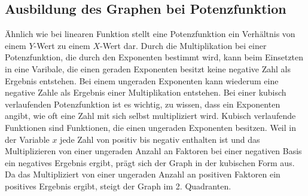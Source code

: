\subsection{Ausbildung des Graphen bei Potenzfunktion}\label{sec:Potenzfunktionen/Ausbildung des Graphen bei Potenzfunktionen}
Ähnlich wie bei linearen Funktion stellt eine Potenzfunktion ein Verhältnis von einem $Y$-Wert zu einem $X$-Wert dar. Durch die Multiplikation bei einer Potenzfunktion, die durch den Exponenten bestimmt wird, kann beim Einsetzten in eine Varibale, die einen geraden Exponenten besitzt keine negative Zahl als Ergebnis entstehen. Bei einem ungeraden Exponenten kann wiederum eine negative Zahle als Ergebnis einer Multiplikation entstehen. Bei einer kubisch verlaufenden Potenzfunktion ist es wichtig, zu wissen, dass ein Exponenten angibt, wie oft eine Zahl mit sich selbst multipliziert wird. Kubisch verlaufende Funktionen sind Funktionen, die einen ungeraden Exponenten besitzen. Weil in der Variable $x$ jede Zahl von positiv bis negativ enthalten ist und das Multiplizieren von einer ungeraden Anzahl an Faktoren bei einer negativen Basis ein negatives Ergebnis ergibt, prägt sich der Graph in der kubischen Form aus. Da das Multipliziert von einer ungeraden Anzahl an positiven Faktoren ein positives Ergebnis ergibt, steigt der Graph im 2. Quadranten. 



